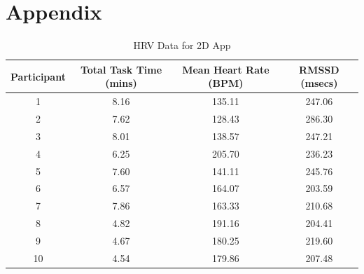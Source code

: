 \documentclass{CPP}
\begin{document}


\SuppChap  %


% 
% 


\SuppChap  %

\chapter*{Appendix}



\begin{table}
\centering
\caption{HRV Data for 2D App}
\label{tab:2d_hrv}
\begin{tabular}{|c|c|c|c|}
 \hline
 Participant & Total Task Time (mins) & Mean Heart Rate (BPM) & RMSSD (msecs) \\
 \hline
 1  & 8.16 & 135.11 & 247.06 \\
 2  & 7.62 & 128.43 & 286.30 \\
 3  & 8.01 & 138.57 & 247.21 \\
 4  & 6.25 & 205.70 & 236.23 \\
 5  & 7.60 & 141.11 & 245.76 \\
 6  & 6.57 & 164.07 & 203.59 \\
 7  & 7.86 & 163.33 & 210.68 \\
 8  & 4.82 & 191.16 & 204.41 \\
 9  & 4.67 & 180.25 & 219.60 \\
 10 & 4.54 & 179.86 & 207.48 \\
 \hline
\end{tabular}
\end{table}
\end{document}

